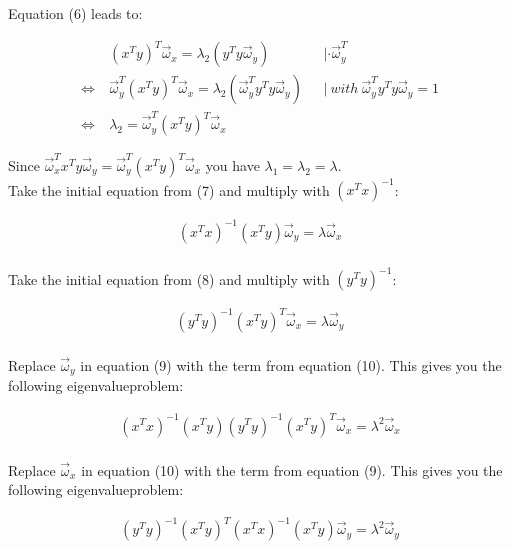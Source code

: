 \documentclass{article}
\begin{document}
Equation (6) leads to:

\begin{equation}
\begin{aligned}
&(x^T y)^T \vec{\omega}_x = \lambda_2(y^Ty\vec{\omega}_y) & ~~~| \cdot \vec{\omega}_y^T\\
\Leftrightarrow ~ & \vec{\omega}_y^T(x^T y)^T \vec{\omega}_x = \lambda_2(\vec{\omega}_y^Ty^Ty\vec{\omega}_y) & ~~~| ~ with ~ \vec{\omega}_y^T y^Ty\vec{\omega}_y = 1 \\
\Leftrightarrow ~ &\lambda_2 = \vec{\omega}_y^T(x^T y)^T \vec{\omega}_x
\end{aligned}
\end{equation}

Since $\vec{\omega}_x^T x^T y \vec{\omega}_y = \vec{\omega}_y^T(x^T y)^T \vec{\omega}_x$ you have $\lambda_1 = \lambda_2 = \lambda$. \\
Take the initial equation from (7) and multiply with $(x^T x)^{-1}$:

\begin{equation}
\begin{aligned}
(x^T x)^{-1} (x^T y) \vec{\omega}_y = \lambda \vec{\omega}_x \\
\end{aligned}
\end{equation}

Take the initial equation from (8) and multiply with $(y^T y)^{-1}$:

\begin{equation}
\begin{aligned}
(y^T y)^{-1} (x^T y)^T \vec{\omega}_x = \lambda \vec{\omega}_y \\
\end{aligned}
\end{equation}

Replace $\vec{\omega}_y$ in equation (9) with the term from equation (10). This gives you the following eigenvalueproblem:

\begin{equation}
\begin{aligned}
(x^T x)^{-1} (x^T y) (y^T y)^{-1} (x^T y)^T \vec{\omega}_x = \lambda^2 \vec{\omega}_x \\
\end{aligned}
\end{equation}

Replace $\vec{\omega}_x$ in equation (10) with the term from equation (9). This gives you the following eigenvalueproblem:

\begin{equation}
\begin{aligned}
(y^T y)^{-1} (x^T y)^T (x^T x)^{-1} (x^T y) \vec{\omega}_y = \lambda^2 \vec{\omega}_y \\
\end{aligned}
\end{equation}
\end{document}
